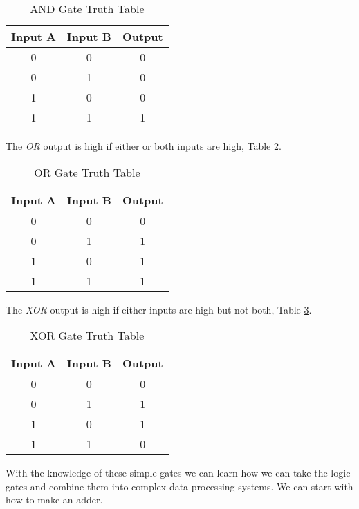 \begin{table}[h!]  
\begin{center}    
\caption{AND Gate Truth Table} 
\label{tab:ttand} \begin{tabular}{|c|c|c|}  
\textbf{Input A} & \textbf{Input B} & \textbf{Output}\\  
\hline  
0 & 0 & 0\\  
0 & 1 & 0\\  
1 & 0 & 0\\  
1 & 1 & 1\\ 
\end{tabular}  
\end{center}
\end{table}

The \emph{OR} output is high if either or both inputs are high, Table \ref{tab:ttor}.

\begin{table}[h!]  
\begin{center}    
\caption{OR Gate Truth Table} 
\label{tab:ttor} 
\begin{tabular}{|c|c|c|}  
\textbf{Input A} & \textbf{Input B} & \textbf{Output}\\  
\hline  
0 & 0 & 0\\  
0 & 1 & 1\\  
1 & 0 & 1\\  
1 & 1 & 1\\ 
\end{tabular}  
\end{center}
\end{table}

The \emph{XOR} output is high if either inputs are high but not both, Table \ref{tab:ttxor}.

\begin{table}[h!]  
\begin{center}    
\caption{XOR Gate Truth Table} 
\label{tab:ttxor} 
\begin{tabular}{|c|c|c|}  
\textbf{Input A} & \textbf{Input B} & \textbf{Output}\\  
\hline  
0 & 0 & 0\\  
0 & 1 & 1\\  
1 & 0 & 1\\  
1 & 1 & 0\\ 
\end{tabular}  
\end{center}
\end{table}

With the knowledge of these simple gates we can learn how we can take the logic gates and combine them into complex data processing systems. We can start with how to make an adder.
	
